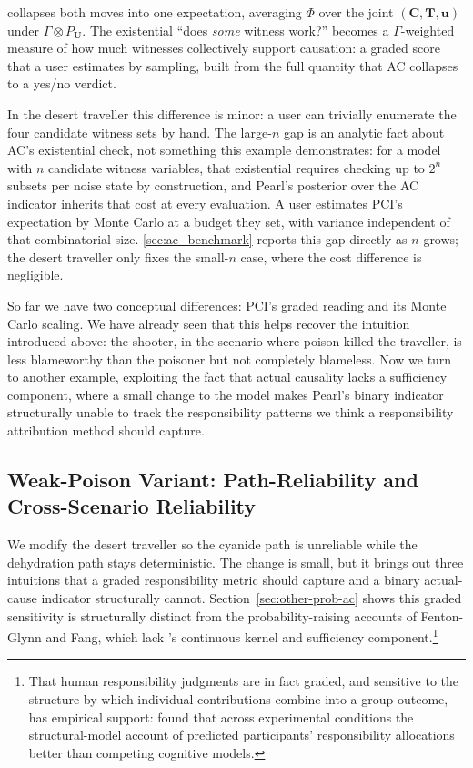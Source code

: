 \ourapproach{} collapses both moves into one expectation, averaging $\Phi$
over the joint $(\mathbf{C}, \mathbf{T}, \mathbf{u})$ under $\Gamma \otimes
P_{\mathbf{U}}$. The existential ``does \emph{some} witness work?'' becomes a $\Gamma$-weighted measure of how much witnesses collectively support causation: a graded score that a user estimates by sampling, built from the full quantity that AC collapses to a yes/no verdict.

In the desert traveller this difference is minor: a user can trivially
enumerate the four candidate witness sets by hand. The large-$n$ gap is an
analytic fact about AC's existential check, not something this example
demonstrates: for a model with $n$ candidate witness variables, that
existential requires checking up to $2^n$ subsets per noise state by
construction, and Pearl's posterior over the AC indicator inherits that cost
at every evaluation. A user estimates PCI's expectation by Monte Carlo at a
budget they set, with variance independent of that combinatorial size.
\cref{sec:ac_benchmark} reports this gap directly as $n$ grows; the desert
traveller only fixes the small-$n$ case, where the cost difference is
negligible.

So far we have two conceptual differences: PCI's graded reading and its Monte Carlo scaling.
We have already seen that this helps recover the intuition introduced above: the shooter, in the scenario where poison killed the traveller, is less blameworthy than the poisoner but not
completely blameless. Now we turn to another example, exploiting the fact that actual causality
lacks a sufficiency component, where a small change to the model makes Pearl's binary indicator
structurally unable to track the responsibility patterns we think a responsibility attribution
method should capture.

\subsection{Weak-Poison Variant: Path-Reliability and Cross-Scenario Reliability}
\label{sub:weak-poison}

We modify the desert traveller so the cyanide path is unreliable while the
dehydration path stays deterministic. The change is small, but it brings out three
 intuitions that a graded responsibility metric
should capture and a binary actual-cause indicator structurally cannot.
Section~\ref{sec:other-prob-ac} shows this graded sensitivity is structurally
distinct from the probability-raising accounts of Fenton-Glynn and Fang, which
lack \ourapproach's continuous kernel and sufficiency component.\footnote{That
human responsibility judgments are in fact graded, and sensitive to the structure by
which individual contributions combine into a group outcome, has empirical support:
\citet{gerstenbergSpreadingBlame2010} found that across experimental conditions the
structural-model account of \citet{chocklerResponsibilityBlameStructuralModel2004}
predicted participants' responsibility allocations better than competing cognitive
models.}

